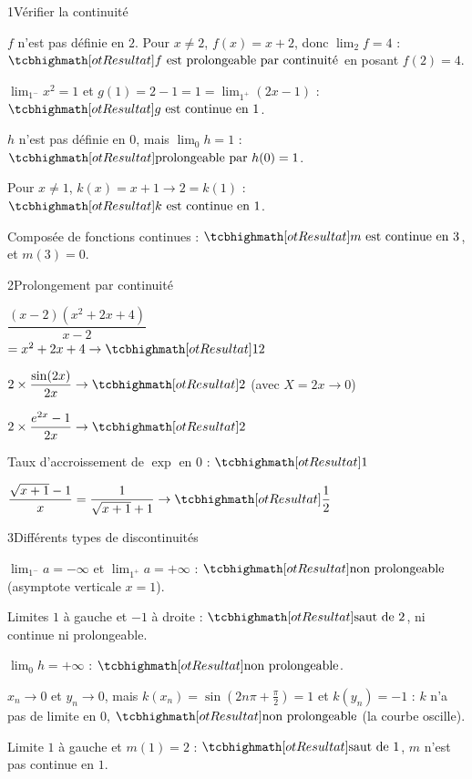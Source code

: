 

\begin{deuxcolonnes}

\begin{corrige}{1}{Vérifier la continuité}
\begin{questions}
  \item $f$ n'est pas définie en $2$. Pour $x\neq2$, $f(x)=x+2$, donc $\lim_{2}f=4$ :
    $\res{f\text{ est prolongeable par continuité}}$ en posant $f(2)=4$.
  \item $\lim_{1^{-}}x^{2}=1$ et $g(1)=2-1=1=\lim_{1^{+}}(2x-1)$ : $\res{g\text{ est continue en }1}$.
  \item $h$ n'est pas définie en $0$, mais $\lim_{0}h=1$ : $\res{\text{prolongeable par }h(0)=1}$.
  \item Pour $x\neq1$, $k(x)=x+1\to2=k(1)$ : $\res{k\text{ est continue en }1}$.
  \item Composée de fonctions continues : $\res{m\text{ est continue en }3}$, et $m(3)=0$.
\end{questions}
\end{corrige}

\begin{corrige}{2}{Prolongement par continuité}
\begin{questions}
  \item $\dfrac{(x-2)\left(x^{2}+2x+4\right)}{x-2}$\\ $=x^{2}+2x+4\to\res{12}$
  \item $2\times\dfrac{\sin(2x)}{2x}\to\res{2}$ (avec $X=2x\to0$)
  \item $2\times\dfrac{e^{2x}-1}{2x}\to\res{2}$
  \item Taux d'accroissement de $\exp$ en $0$ : $\res{1}$
  \item $\dfrac{\sqrt{x+1}-1}{x}=\dfrac{1}{\sqrt{x+1}+1}\to\res{\dfrac12}$
\end{questions}
\end{corrige}

\begin{corrige}{3}{Différents types de discontinuités}
\begin{questions}
  \item $\lim_{1^{-}}a=-\infty$ et $\lim_{1^{+}}a=+\infty$ : $\res{\text{non prolongeable}}$ (asymptote verticale $x=1$).
  \item Limites $1$ à gauche et $-1$ à droite : $\res{\text{saut de }2}$, ni continue ni prolongeable.
  \item $\lim_{0}h=+\infty$ : $\res{\text{non prolongeable}}$.
  \item $x_n\to0$ et $y_n\to0$, mais $k(x_n)=\sin\left(2n\pi+\frac\pi2\right)=1$ et $k(y_n)=-1$ : $k$ n'a pas de limite en $0$,
    $\res{\text{non prolongeable}}$ (la courbe oscille).
  \item Limite $1$ à gauche et $m(1)=2$ : $\res{\text{saut de }1}$, $m$ n'est pas continue en $1$.
\end{questions}
\end{corrige}


\end{deuxcolonnes}
